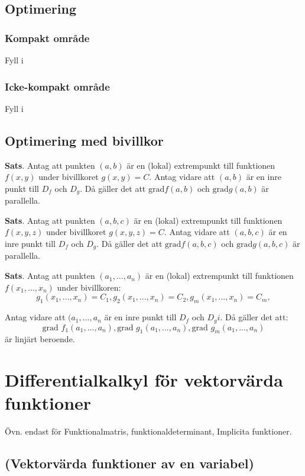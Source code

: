 \documentclass[a4paper,12pt]{article}
\begin{document}
\subsection{Optimering}

\subsubsection*{Kompakt område}
Fyll i

\subsubsection*{Icke-kompakt område}
Fyll i

\subsection{Optimering med bivillkor}
\textbf{Sats}. Antag att punkten $(a, b)$ är en (lokal) extrempunkt till funktionen $f(x, y)$ under bivillkoret $g(x, y) = C$. 
Antag vidare att $(a, b)$ är en inre punkt till $D_f$ och $D_g$. Då gäller det att $\text{grad} f(a, b)$ och $\text{grad} g(a, b)$ är parallella.

\textbf{Sats}. Antag att punkten $(a, b, c)$ är en (lokal) extrempunkt till funktionen $f(x, y, z)$ under bivillkoret $g(x, y, z) = C$. 
Antag vidare att $(a, b, c)$ är en inre punkt till $D_f$ och $D_g$. Då gäller det att $\text{grad} f(a, b, c)$ och $\text{grad} g(a, b, c)$ är parallella.

\textbf{Sats}. Antag att punkten $(a_1, ..., a_n)$ är en (lokal) extrempunkt till funktionen $f(x_1, ..., x_n)$ under bivillkoren:
\[
    g_1(x_1, ..., x_n) = C_1, g_2(x_1, ..., x_n) = C_2, g_m(x_1, ..., x_n) = C_m, 
\]

Antag vidare att $(a_1,..., a_n$ är en inre punkt till $D_f$ och $D_gi$. Då gäller det att:
\[
    \text{grad } f_1(a_1, ..., a_n), \text{grad } g_1(a_1, ..., a_n), \text{grad } g_m(a_1, ..., a_n)
\]
är linjärt beroende.

\section{Differentialkalkyl för vektorvärda funktioner}
Övn. endast för Funktionalmatris, funktionaldeterminant, Implicita funktioner.

\subsection{(Vektorvärda funktioner av en variabel)}
\end{document}
